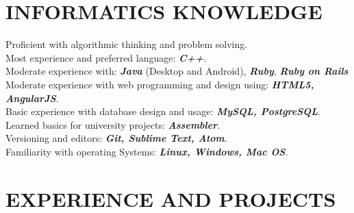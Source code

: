 \documentclass[margin, 10pt]{res} %
\begin{document}
\begin{resume}

\section{INFORMATICS KNOWLEDGE}
Proficient with algorithmic thinking and problem solving. \\
Most experience and preferred language: \textbf{\textit{C++}}. \\
Moderate experience with: \textbf{\textit{Java}} (Desktop and Android),
                          \textbf{\textit{Ruby}}, \textbf{\textit{Ruby on Rails}} \\
Moderate experience with web programming and design using: \textbf{\textit{HTML5, AngularJS}}. \\
Basic experience with database design and usage: \textbf{\textit{MySQL, PostgreSQL}}. \\
Learned basics for university projects: \textbf{\textit{Assembler}}. \\
Versioning and editors: \textbf{\textit{Git, Sublime Text, Atom}}.\\
Familiarity with operating Systems: \textbf{\textit{Linux, Windows, Mac OS}}.



\section{EXPERIENCE AND PROJECTS}


\end{resume}
\end{document}
